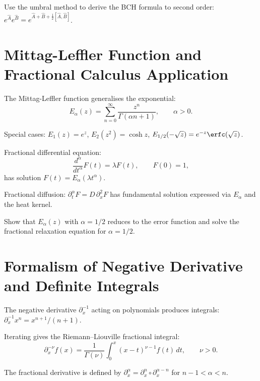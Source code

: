 \begin{exercise}
Use the umbral method to derive the BCH formula to second order:
$e^{\hat A}e^{\hat B}=e^{\hat A+\hat B+\frac12[\hat A,\hat B]}$.
\end{exercise}

\section{Mittag-Leffler Function and Fractional Calculus Application}

The Mittag-Leffler function generalises the exponential:
\begin{equation}
E_\alpha(z) = \sum_{n=0}^{\infty}\frac{z^n}{\Gamma(\alpha n+1)},
\qquad \alpha>0.
\label{eq:9.7.1}
\end{equation}

Special cases: $E_1(z)=e^z$, $E_2(z^2)=\cosh z$,
$E_{1/2}(-\sqrt{z})=e^{-z}\erfc(\sqrt{z})$.

Fractional differential equation:
\begin{equation}
\frac{d^\alpha}{dt^\alpha}F(t) = \lambda F(t), \qquad F(0)=1,
\label{eq:9.7.2}
\end{equation}
has solution $F(t)=E_\alpha(\lambda t^\alpha)$.

Fractional diffusion: $\partial_t^\alpha F = D\,\partial_x^2 F$ has fundamental
solution expressed via $E_\alpha$ and the heat kernel.

\begin{exercise}
Show that $E_\alpha(z)$ with $\alpha=1/2$ reduces to the error function
and solve the fractional relaxation equation for $\alpha=1/2$.
\end{exercise}

\section{Formalism of Negative Derivative and Definite Integrals}

The negative derivative $\partial_x^{-1}$ acting on polynomials produces
integrals: $\partial_x^{-1}x^n = x^{n+1}/(n+1)$.

Iterating gives the Riemann--Liouville fractional integral:
\begin{equation}
\partial_x^{-\nu}f(x) = \frac{1}{\Gamma(\nu)}\int_0^x (x-t)^{\nu-1}f(t)\,dt,
\qquad \nu>0.
\label{eq:9.8.1}
\end{equation}

The fractional derivative is defined by $\partial_x^\alpha = \partial_x^n\circ\partial_x^{\alpha-n}$
for $n-1<\alpha<n$.

